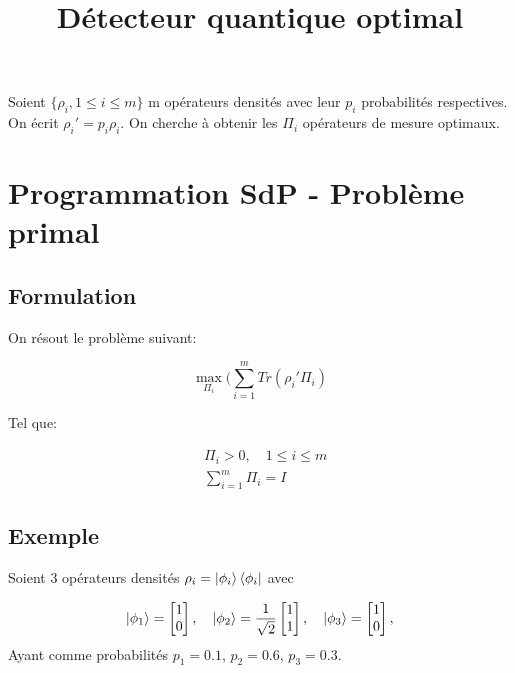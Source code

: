\documentclass[12pt,a4paper]{article}
\title{Détecteur quantique optimal}
\date{}
\begin{document}
    \maketitle

    Soient $\{\rho_i, 1 \leq i \leq m\}$ m opérateurs densités avec leur $p_i$ probabilités respectives. On écrit $\rho_i' = p_i \rho_i$. On cherche à obtenir les $\Pi_i$ opérateurs de mesure optimaux.

    \section*{Programmation SdP - Problème primal}


    \subsection*{Formulation}

    On résout le problème suivant:

    \begin{equation}
        \max\limits_{\Pi_i} (\displaystyle \sum_{i=1}^{m} Tr(\rho_i' \Pi_i)
    \end{equation}

    Tel que:

    \begin{align}
        & \Pi_i > 0, \quad 1 \leq i \leq m \nonumber \\
        & \displaystyle \sum_{i=1}^{m} \Pi_i = I
    \end{align}

    \subsection*{Exemple}
    Soient 3 opérateurs densités $\rho_i = \ket{\phi_i}\bra{\phi_i}$ avec 

    \begin{equation*}
        \ket{\phi_1} = \begin{bmatrix} 1 \\0\end{bmatrix} , \quad \ket{\phi_2} = \frac{1}{\sqrt{2}} \begin{bmatrix} 1 \\ 1 \end{bmatrix} , \quad \ket{\phi_3} = \begin{bmatrix}1 \\ 0 \end{bmatrix},
    \end{equation*}
    Ayant comme probabilités $p_1 = 0.1$, $p_2 = 0.6$, $p_3 = 0.3$.
\end{document}
